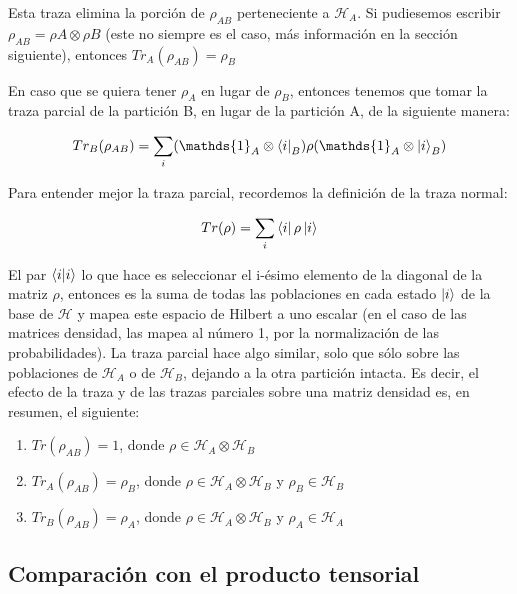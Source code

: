 Esta traza elimina la porción de $\rho_{A B}$ perteneciente a $\mathcal{H}_A$. Si pudiesemos escribir $\rho_{A B} = \rho{A} \otimes \rho{B}$ (este no siempre es el caso, más información en la sección siguiente), entonces $Tr_A(\rho_{A B}) = \rho_B$

En caso que se quiera tener $\rho_A$ en lugar de $\rho_B$, entonces tenemos que tomar la traza parcial de la partición B, en lugar de la partición A, de la siguiente manera:

\begin{equation}
    Tr_B(\rho_{A B}) = \sum\limits_i (\mathds{1}_A \otimes \bra{i}_B) \rho (\mathds{1}_A \otimes \ket{i}_B)
\end{equation}

Para entender mejor la traza parcial, recordemos la definición de la traza normal:

\begin{equation}
    Tr(\rho) = \sum\limits_i \bra{i} \rho \ket{i}
\end{equation}

El par $\bra{i} \ket{i}$ lo que hace es seleccionar el i-ésimo elemento de la diagonal de la matriz $\rho$, entonces es la suma de todas las poblaciones en cada estado $\ket{i}$ de la base de $\mathcal{H}$ y mapea este espacio de Hilbert a uno escalar (en el caso de las matrices densidad, las mapea al número 1, por la normalización de las probabilidades). La traza parcial hace algo similar, solo que sólo sobre las poblaciones de $\mathcal{H}_A$ o de $\mathcal{H}_B$, dejando a la otra partición intacta. Es decir, el efecto de la traza y de las trazas parciales sobre una matriz densidad es, en resumen, el siguiente:

\begin{enumerate}
    \item $Tr(\rho_{A B}) = 1$, donde $\rho \in \mathcal{H}_A \otimes \mathcal{H}_B$
    \item $Tr_A(\rho_{A B}) = \rho_B$, donde $\rho \in \mathcal{H}_A \otimes \mathcal{H}_B$ y $\rho_B \in \mathcal{H}_B$
    \item $Tr_B(\rho_{A B}) = \rho_A$, donde $\rho \in \mathcal{H}_A \otimes \mathcal{H}_B$ y $\rho_A \in \mathcal{H}_A$
\end{enumerate}


\subsection{Comparación con el producto tensorial}

